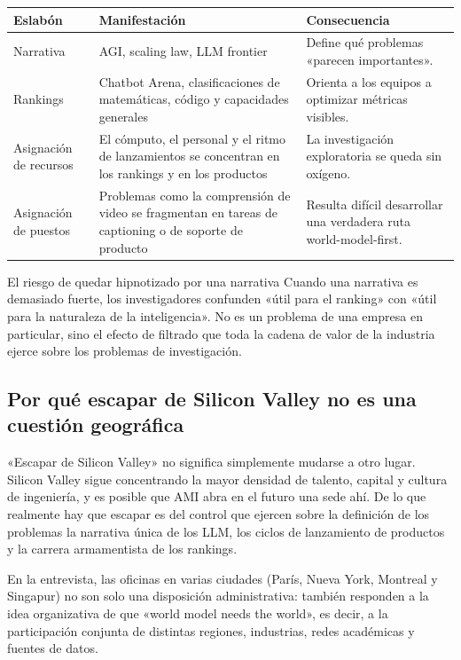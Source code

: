 \documentclass[a4paper]{article}
\begin{document}
\begin{center}
\begin{tabularx}{0.95\textwidth}{p{}p{}X}
\toprule
Eslabón & Manifestación & Consecuencia \\
\midrule
Narrativa & AGI, scaling law, LLM frontier & Define qué problemas «parecen importantes». \\
Rankings & Chatbot Arena, clasificaciones de matemáticas, código y capacidades generales & Orienta a los equipos a optimizar métricas visibles. \\
Asignación de recursos & El cómputo, el personal y el ritmo de lanzamientos se concentran en los rankings y en los productos & La investigación exploratoria se queda sin oxígeno. \\
Asignación de puestos & Problemas como la comprensión de video se fragmentan en tareas de captioning o de soporte de producto & Resulta difícil desarrollar una verdadera ruta world-model-first. \\
\bottomrule
\end{tabularx}
\end{center}

\begin{warningbox}{El riesgo de quedar hipnotizado por una narrativa}
Cuando una narrativa es demasiado fuerte, los investigadores confunden «útil para el ranking» con «útil para la naturaleza de la inteligencia». No es un problema de una empresa en particular, sino el efecto de filtrado que toda la cadena de valor de la industria ejerce sobre los problemas de investigación.
\end{warningbox}

\subsection{Por qué escapar de Silicon Valley no es una cuestión geográfica}

«Escapar de Silicon Valley» no significa simplemente mudarse a otro lugar. Silicon Valley sigue concentrando la mayor densidad de talento, capital y cultura de ingeniería, y es posible que AMI abra en el futuro una sede ahí. De lo que realmente hay que escapar es del control que ejercen sobre la definición de los problemas la narrativa única de los LLM, los ciclos de lanzamiento de productos y la carrera armamentista de los rankings.

En la entrevista, las oficinas en varias ciudades (París, Nueva York, Montreal y Singapur) no son solo una disposición administrativa: también responden a la idea organizativa de que «world model needs the world», es decir, a la participación conjunta de distintas regiones, industrias, redes académicas y fuentes de datos.
\end{document}
